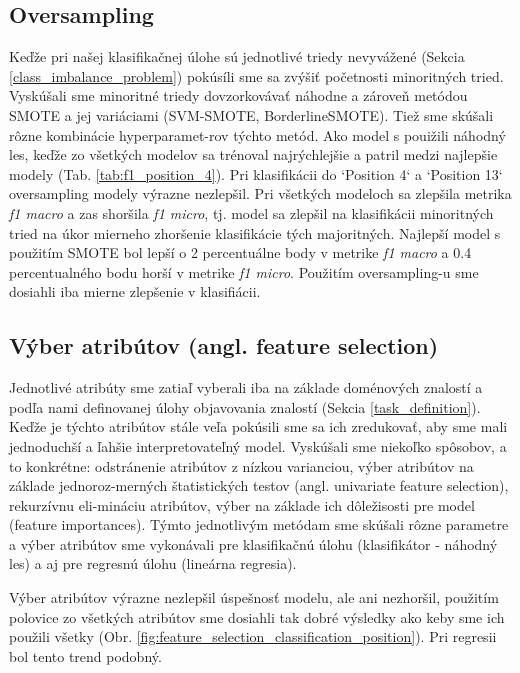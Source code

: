 \documentclass[runningheads]{llncs}
\begin{document}
\subsection{Oversampling}

Keďže pri našej klasifikačnej úlohe sú jednotlivé triedy nevyvážené (Sekcia \ref{class_imbalance_problem}) pokúsíli sme sa zvýšiť početnosti minoritných tried. Vyskúšali sme minoritné triedy dovzorkovávať náhodne a zároveň metódou SMOTE a jej variáciami (SVM-SMOTE, BorderlineSMOTE). Tiež sme skúšali rôzne kombinácie hyperparamet-rov týchto metód.
Ako model s pouižili náhodný les, keďže zo všetkých modelov sa trénoval najrýchlejšie a patril medzi najlepšie modely (Tab. \ref{tab:f1_position_4}). Pri klasifikácii do `Position 4` a `Position 13` oversampling modely výrazne nezlepšil.
Pri všetkých modeloch sa zlepšila metrika \textit{f1 macro} a zas shoršila \textit{f1 micro}, tj. model sa zlepšil na klasifikácii minoritných tried na úkor mierneho zhoršenie klasifikácie tých majoritných.
Najlepší model s použitím SMOTE bol lepší o 2 percentuálne body v metrike \textit{f1 macro} a 0.4 percentualného bodu horší v metrike \textit{f1 micro}.
Použitím oversampling-u sme dosiahli iba mierne zlepšenie v klasifiácii.

\subsection{Výber atribútov (angl. feature selection)}

Jednotlivé atribúty sme zatiaľ vyberali iba na základe doménových znalostí a podľa nami definovanej úlohy objavovania znalostí (Sekcia \ref{task_definition}). Keďže je týchto atribútov stále veľa pokúsili sme sa ich zredukovať, aby sme mali jednoduchší a ľahšie interpretovateľný model. Vyskúšali sme niekoľko spôsobov, a to konkrétne: odstránenie atribútov z nízkou varianciou, výber atribútov na základe jednoroz-merných štatistických testov (angl. univariate feature selection), rekurzívnu eli-mináciu atribútov, výber na základe ich dôležisosti pre model (feature importances). Týmto jednotlivým metódam sme skúšali rôzne parametre a výber atribútov sme vykonávali pre klasifikačnú úlohu (klasifikátor - náhodný les) a aj pre regresnú úlohu (lineárna regresia).

Výber atribútov výrazne nezlepšil úspešnosť modelu, ale ani nezhoršil, použitím polovice zo všetkých atribútov sme dosiahli tak dobré výsledky ako keby sme ich použili všetky (Obr. \ref{fig:feature_selection_classification_position}). Pri regresii bol tento trend podobný.
\end{document}
